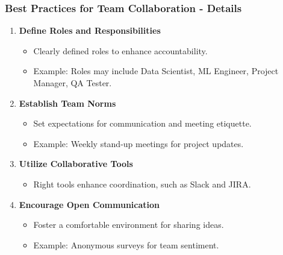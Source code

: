 \documentclass[aspectratio=169]{beamer}
\begin{document}
\begin{frame}[fragile]
    \frametitle{Best Practices for Team Collaboration - Details}
    \begin{enumerate}
        \item \textbf{Define Roles and Responsibilities}
            \begin{itemize}
                \item Clearly defined roles to enhance accountability.
                \item Example: Roles may include Data Scientist, ML Engineer, Project Manager, QA Tester.
            \end{itemize}
            
        \item \textbf{Establish Team Norms}
            \begin{itemize}
                \item Set expectations for communication and meeting etiquette.
                \item Example: Weekly stand-up meetings for project updates.
            \end{itemize}
            
        \item \textbf{Utilize Collaborative Tools}
            \begin{itemize}
                \item Right tools enhance coordination, such as Slack and JIRA.
            \end{itemize}
        
        \item \textbf{Encourage Open Communication}
            \begin{itemize}
                \item Foster a comfortable environment for sharing ideas.
                \item Example: Anonymous surveys for team sentiment.
            \end{itemize}
    \end{enumerate}
\end{frame}
\end{document}
